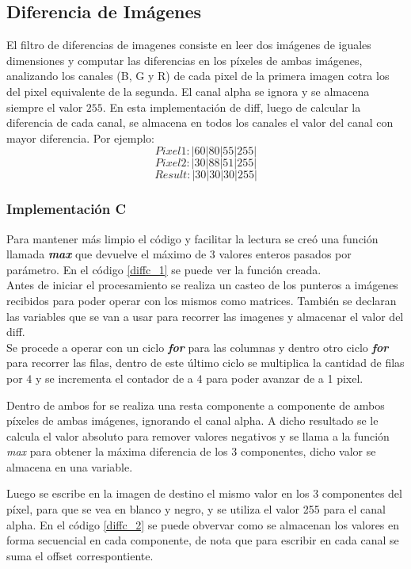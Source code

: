 \subsection{Diferencia de Im\'agenes}
El filtro de diferencias de imagenes consiste en leer dos im\'agenes de iguales dimensiones y computar las diferencias en los p\'ixeles de ambas im\'agenes, analizando los canales (B, G y R) de cada pixel de la primera imagen cotra los del pixel equivalente de la segunda. El canal alpha se ignora y se almacena siempre el valor $255$. En esta implementación de diff, luego de calcular la diferencia de cada canal, se almacena en todos los canales el valor del canal con mayor diferencia. Por ejemplo: \\
$$ Pixel1: |60|80|55|255|$$
$$ Pixel2: |30|88|51|255|$$
$$ Result: |30|30|30|255|$$

\subsubsection{Implementaci\'on C}
\label{sec:diff_impc}
Para mantener m\'as limpio el c\'odigo y facilitar la lectura se cre\'o una funci\'on llamada \textbf{\emph{max}} que devuelve el m\'aximo de 3 valores enteros pasados por par\'ametro. En el c\'odigo \ref{diffc_1} se puede ver la funci\'on creada.\\

Antes de iniciar el procesamiento se realiza un casteo de los punteros a im\'agenes recibidos para poder operar con los mismos como matrices. Tambi\'en se declaran las variables que se van a usar para recorrer las imagenes y almacenar el valor del diff. \\
Se procede a operar con un ciclo \textbf{\emph{for}} para las columnas y dentro otro ciclo \textbf{\emph{for}} para recorrer las filas, dentro de este \'ultimo ciclo se multiplica la cantidad de filas por $4$ y se incrementa el contador de a $4$ para poder avanzar de a 1 pixel.

Dentro de ambos for se realiza una resta componente a componente de ambos p\'ixeles de ambas im\'agenes, ignorando el canal alpha. A dicho resultado se le calcula el valor absoluto para remover valores negativos y se llama a la funci\'on \emph{max} para obtener la m\'axima diferencia de los 3 componentes, dicho valor se almacena en una variable.

Luego se escribe en la imagen de destino el mismo valor en los 3 componentes del p\'ixel, para que se vea en blanco y negro, y se utiliza el valor 255 para el canal alpha. En el c\'odigo \ref{diffc_2} se puede obvervar como se almacenan los valores en forma secuencial en cada componente, de nota que para escribir en cada canal se suma el offset correspontiente.

